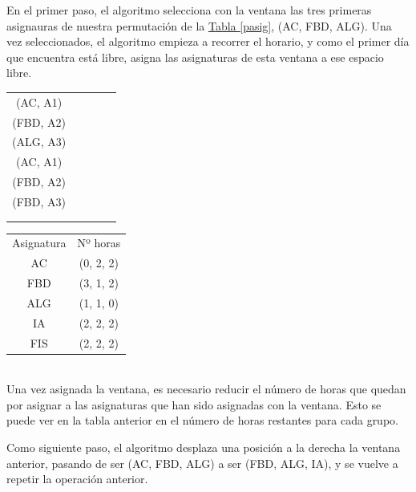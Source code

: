 En el primer paso, el algoritmo selecciona con la ventana las tres primeras asignauras de nuestra permutación de la \hyperref[pasig]{Tabla \ref*{pasig}}, (AC, FBD, ALG). Una vez seleccionados, el algoritmo empieza a recorrer el horario, y como el primer día que encuentra está libre, asigna las asignaturas de esta ventana a ese espacio libre.\\


\begin{minipage}{0.5\textwidth}    
\begin{tabular}{| c | c | c | c | c |}
\hline
 (AC, A1) &  &  &  & \\
 (FBD, A2) &  &  &  & \\
 (ALG, A3) &  &  &  & \\
 \hline
 (AC, A1) &  &  &  & \\
 (FBD, A2) &  &  &  & \\
 (FBD, A3) &  &  &  & \\
 \hline
 &  &  &  & \\
 \hline
 &  &  &  & \\
 \hline 
\end{tabular}
\end{minipage}
\begin{minipage}{0.5\textwidth}
\begin{tabular}{c | c}
Asignatura & Nº horas \\
AC & (0, 2, 2) \\
FBD & (3, 1, 2) \\
ALG & (1, 1, 0) \\
IA & (2, 2, 2) \\
FIS & (2, 2, 2)
\end{tabular}
\end{minipage}
~\\

Una vez asignada la ventana, es necesario reducir el número de horas que quedan por asignar a las asignaturas que han sido asignadas con la ventana. Esto se puede ver en la tabla anterior en el número de horas restantes para cada grupo.

Como siguiente paso, el algoritmo desplaza una posición a la derecha la ventana anterior, pasando de ser (AC, FBD, ALG) a ser (FBD, ALG, IA), y se vuelve a repetir la operación anterior.\\

